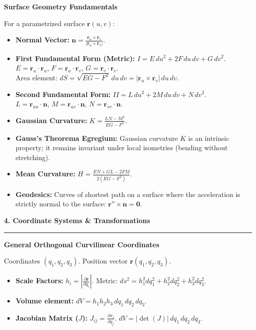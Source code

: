\documentclass[10pt, landscape, twocolumn]{article}
\newcommand{\cheatsheetsection}[1]{
    \vspace{0.8em}
    {\color{themeblue}\large\bfseries #1} \par
    \vspace{-0.4em}
    {\color{themeblue}\rule{\linewidth}{1pt}} \par
    \vspace{0.3em}
}
\newcommand{\cheatsheetsubsection}[1]{
    \vspace{0.5em}
    {\color{themeblue}\normalsize\bfseries #1} \par
    \vspace{0.2em}
}
\begin{document}
\vspace{-2}
\cheatsheetsubsection{Surface Geometry Fundamentals}
For a parametrized surface $\mathbf{r}(u,v)$:
\begin{itemize}[leftmargin=*, nosep]
    \item \textbf{Normal Vector:} $\mathbf{n} = \frac{\mathbf{r}_u \times \mathbf{r}_v}{|\mathbf{r}_u \times \mathbf{r}_v|}$.
    \item \textbf{First Fundamental Form (Metric):} $I = E\,du^2 + 2F\,du\,dv + G\,dv^2$. \\
    $E = \mathbf{r}_u \cdot \mathbf{r}_u$, $F = \mathbf{r}_u \cdot \mathbf{r}_v$, $G = \mathbf{r}_v \cdot \mathbf{r}_v$. \\
    Area element: $dS = \sqrt{EG - F^2} \, du \, dv = |\mathbf{r}_u \times \mathbf{r}_v| \, du \, dv$.
    \item \textbf{Second Fundamental Form:} $II = L\,du^2 + 2M\,du\,dv + N\,dv^2$. \\
    $L = \mathbf{r}_{uu} \cdot \mathbf{n}$, $M = \mathbf{r}_{uv} \cdot \mathbf{n}$, $N = \mathbf{r}_{vv} \cdot \mathbf{n}$.
    \item \textbf{Gaussian Curvature:} $K = \frac{LN - M^2}{EG - F^2}$. 
    \item \textbf{Gauss's Theorema Egregium:} Gaussian curvature $K$ is an intrinsic property; it remains invariant under local isometries (bending without stretching).
    \item \textbf{Mean Curvature:} $H = \frac{EN + GL - 2FM}{2(EG - F^2)}$.
    \item \textbf{Geodesics:} Curves of shortest path on a surface where the acceleration is strictly normal to the surface: $\mathbf{r}'' \times \mathbf{n} = \mathbf{0}$.
\end{itemize}

\cheatsheetsection{4. Coordinate Systems \& Transformations}

\cheatsheetsubsection{General Orthogonal Curvilinear Coordinates}
Coordinates $(q_1, q_2, q_3)$. Position vector $\mathbf{r}(q_1, q_2, q_3)$.
\begin{itemize}[leftmargin=*, nosep]
    \item \textbf{Scale Factors:} $h_i = \left| \frac{\partial \mathbf{r}}{\partial q_i} \right|$. Metric: $ds^2 = h_1^2 dq_1^2 + h_2^2 dq_2^2 + h_3^2 dq_3^2$.
    \item \textbf{Volume element:} $dV = h_1 h_2 h_3 \, dq_1 \, dq_2 \, dq_3$.
    \item \textbf{Jacobian Matrix ($J$):} $J_{ij} = \frac{\partial x_i}{\partial q_j}$. $dV = |\det(J)| \, dq_1 \, dq_2 \, dq_3$.
\end{itemize}
\end{document}
